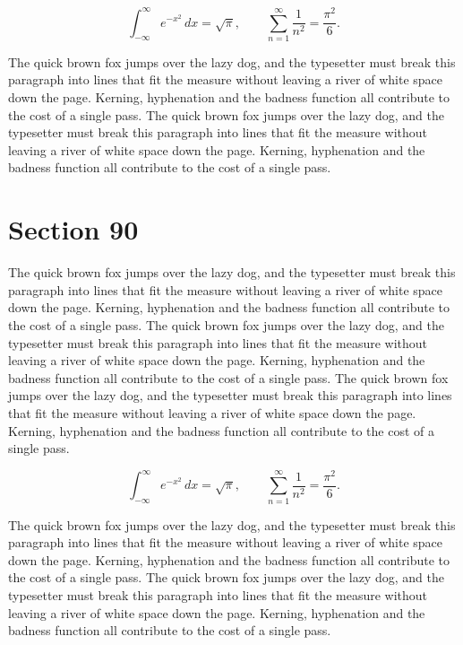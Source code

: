 \documentclass{article}
\begin{document}
\begin{equation}
\int_{-\infty}^{\infty} e^{-x^{2}}\,dx = \sqrt{\pi}, \qquad
\sum_{n=1}^{\infty} \frac{1}{n^{2}} = \frac{\pi^{2}}{6}.
\end{equation}

The quick brown fox jumps over the lazy dog, and the typesetter must break this paragraph into lines that fit the measure without leaving a river of white space down the page. Kerning, hyphenation and the badness function all contribute to the cost of a single pass. The quick brown fox jumps over the lazy dog, and the typesetter must break this paragraph into lines that fit the measure without leaving a river of white space down the page. Kerning, hyphenation and the badness function all contribute to the cost of a single pass. 
\section{Section 90}
The quick brown fox jumps over the lazy dog, and the typesetter must break this paragraph into lines that fit the measure without leaving a river of white space down the page. Kerning, hyphenation and the badness function all contribute to the cost of a single pass. The quick brown fox jumps over the lazy dog, and the typesetter must break this paragraph into lines that fit the measure without leaving a river of white space down the page. Kerning, hyphenation and the badness function all contribute to the cost of a single pass. The quick brown fox jumps over the lazy dog, and the typesetter must break this paragraph into lines that fit the measure without leaving a river of white space down the page. Kerning, hyphenation and the badness function all contribute to the cost of a single pass. 

\begin{equation}
\int_{-\infty}^{\infty} e^{-x^{2}}\,dx = \sqrt{\pi}, \qquad
\sum_{n=1}^{\infty} \frac{1}{n^{2}} = \frac{\pi^{2}}{6}.
\end{equation}

The quick brown fox jumps over the lazy dog, and the typesetter must break this paragraph into lines that fit the measure without leaving a river of white space down the page. Kerning, hyphenation and the badness function all contribute to the cost of a single pass. The quick brown fox jumps over the lazy dog, and the typesetter must break this paragraph into lines that fit the measure without leaving a river of white space down the page. Kerning, hyphenation and the badness function all contribute to the cost of a single pass. 
\end{document}

